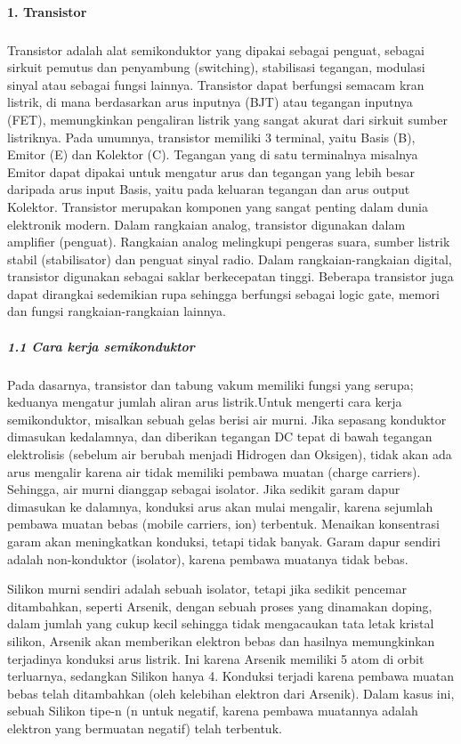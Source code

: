 \documentclass[12pt,a4paper]{article}
\begin{document}
\paragraph{ }
\textbf{1. Transistor}
\subparagraph{ }
 Transistor adalah alat semikonduktor yang dipakai sebagai penguat, sebagai sirkuit pemutus dan penyambung (switching), stabilisasi tegangan, modulasi sinyal atau sebagai fungsi lainnya. Transistor dapat berfungsi semacam kran listrik, di mana berdasarkan arus inputnya (BJT) atau tegangan inputnya (FET), memungkinkan pengaliran listrik yang sangat akurat dari sirkuit sumber listriknya.
	Pada umumnya, transistor memiliki 3 terminal, yaitu Basis (B), Emitor (E) dan Kolektor (C). Tegangan yang di satu terminalnya misalnya Emitor dapat dipakai untuk mengatur arus dan tegangan yang lebih besar daripada arus input Basis, yaitu pada keluaran tegangan dan arus output Kolektor.
	Transistor merupakan komponen yang sangat penting dalam dunia elektronik modern. Dalam rangkaian analog, transistor digunakan dalam amplifier (penguat). Rangkaian analog melingkupi pengeras suara, sumber listrik stabil (stabilisator) dan penguat sinyal radio. Dalam rangkaian-rangkaian digital, transistor digunakan sebagai saklar berkecepatan tinggi. Beberapa transistor juga dapat dirangkai sedemikian rupa sehingga berfungsi sebagai logic gate, memori dan fungsi rangkaian-rangkaian lainnya.
	
\subparagraph{1.1 Cara kerja semikonduktor}
\subparagraph{ }
	Pada dasarnya, transistor dan tabung vakum memiliki fungsi yang serupa; keduanya mengatur jumlah aliran arus listrik.Untuk mengerti cara kerja semikonduktor, misalkan sebuah gelas berisi air murni. Jika sepasang konduktor dimasukan kedalamnya, dan diberikan tegangan DC tepat di bawah tegangan elektrolisis (sebelum air berubah menjadi Hidrogen dan Oksigen), tidak akan ada arus mengalir karena air tidak memiliki pembawa muatan (charge carriers). Sehingga, air murni dianggap sebagai isolator. Jika sedikit garam dapur dimasukan ke dalamnya, konduksi arus akan mulai mengalir, karena sejumlah pembawa muatan bebas (mobile carriers, ion) terbentuk. Menaikan konsentrasi garam akan meningkatkan konduksi, tetapi tidak banyak. Garam dapur sendiri adalah non-konduktor (isolator), karena pembawa muatanya tidak bebas.

Silikon murni sendiri adalah sebuah isolator, tetapi jika sedikit pencemar ditambahkan, seperti Arsenik, dengan sebuah proses yang dinamakan doping, dalam jumlah yang cukup kecil sehingga tidak mengacaukan tata letak kristal silikon, Arsenik akan memberikan elektron bebas dan hasilnya memungkinkan terjadinya konduksi arus listrik. Ini karena Arsenik memiliki 5 atom di orbit terluarnya, sedangkan Silikon hanya 4. Konduksi terjadi karena pembawa muatan bebas telah ditambahkan (oleh kelebihan elektron dari Arsenik). Dalam kasus ini, sebuah Silikon tipe-n (n untuk negatif, karena pembawa muatannya adalah elektron yang bermuatan negatif) telah terbentuk.
\end{document}
